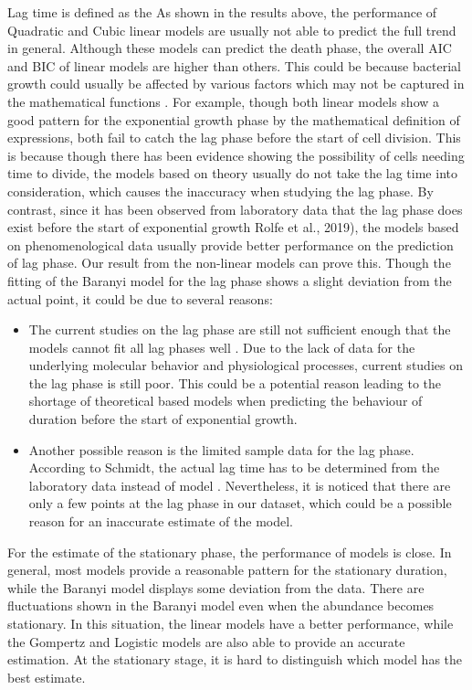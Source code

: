\documentclass[11pt, oneside]{article}
\begin{document}
	Lag time is defined as the As shown in the results above, the performance of Quadratic and Cubic linear models are usually not able to predict the full trend in general. Although these models can predict the death phase, the overall AIC and BIC of linear models are higher than others. This could be because bacterial growth could usually be affected by various factors which may not be captured in the mathematical functions \cite{Sutherland and Norris}. For example, though both linear models show a good pattern for the exponential growth phase by the mathematical definition of expressions, both fail to catch the lag phase before the start of cell division. This is because though there has been evidence showing the possibility of cells needing time to divide, the models based on theory usually do not take the lag time into consideration, which causes the inaccuracy when studying the lag phase. By contrast, since it has been observed from laboratory data that the lag phase does exist before the start of exponential growth \cite{Rolfe et al.}Rolfe et al., 2019), the models based on phenomenological data usually provide better performance on the prediction of lag phase. Our result from the non-linear models can prove this. Though the fitting of the Baranyi model for the lag phase shows a slight deviation from the actual point, it could be due to several reasons:
	\begin{itemize}
	\item The current studies on the lag phase are still not sufficient enough that the models cannot fit all lag phases well \cite{Rolfe et al.}. Due to the lack of data for the underlying molecular behavior and physiological processes, current studies on the lag phase is still poor. This could be a potential reason leading to the shortage of theoretical based models when predicting the behaviour of duration before the start of exponential growth.
	\item Another possible reason is the limited sample data for the lag phase. According to Schmidt, the actual lag time has to be determined from the laboratory data instead of model \cite{Yilmaz}. Nevertheless, it is noticed that there are only a few points at the lag phase in our dataset, which could be a possible reason for an inaccurate estimate of the model.
	\end{itemize}
	\noindent For the estimate of the stationary phase, the performance of models is close. In general, most models provide a reasonable pattern for the stationary duration, while the Baranyi model displays some deviation from the data. There are fluctuations shown in the Baranyi model even when the abundance becomes stationary. In this situation, the linear models have a better performance, while the Gompertz and Logistic models are also able to provide an accurate estimation. At the stationary stage, it is hard to distinguish which model has the best estimate.
\end{document}
